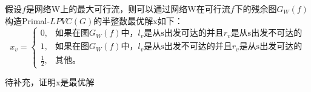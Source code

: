 假设$f$是网络W上的最大可行流，则可以通过网络W在可行流$f$下的残余图$G_W(f)$构造Primal-$LPVC(G)$的半整数最优解x如下：
\begin{equation*}
  x_v = \begin{cases}
            0, & \mbox{如果在图$G_W(f)$中，$l_v$是从s出发可达的并且$r_v$是从s出发不可达的}  \\
            1, & \mbox{如果在图$G_W(f)$中，$l_v$是从s出发不可达的并且$r_v$是从s出发可达的}  \\
            \frac{1}{2}, & \mbox{其他。}
          \end{cases}
\end{equation*}

\textcolor[rgb]{1.00,0.00,0.00}{待补充，证明x是最优解}